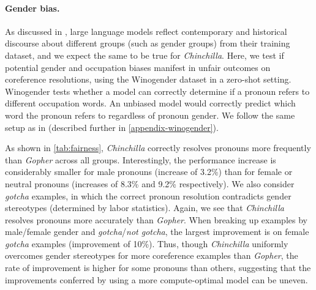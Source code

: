 \documentclass[11pt, a4paper, logo, copyright, nonumbering]{deepmind}
\newcommand{\gopher}{\textit{Gopher}\xspace}
\newcommand{\chinchilla}{\textit{Chinchilla}\xspace}
\begin{document}
\paragraph{Gender bias.}
As discussed in \citet{rae2021gopher}, large language models reflect contemporary and historical discourse about different groups (such as gender groups) from their training dataset, and we expect the same to be true for \chinchilla. 
Here, we test if potential gender and occupation biases manifest in unfair outcomes on coreference resolutions, using the Winogender dataset \citep{rudinger2018gender} in a zero-shot setting.
Winogender tests whether a model can correctly determine if a pronoun refers to different occupation words.
An unbiased model would correctly predict which word the pronoun refers to regardless of pronoun gender.
 We follow the same setup as in \citet{rae2021gopher} (described further in \autoref{appendix-winogender}).


As shown in \autoref{tab:fairness}, \chinchilla correctly resolves pronouns more frequently than \gopher across all groups.  
Interestingly, the performance increase is considerably smaller for male pronouns (increase of 3.2\%) than for female or neutral pronouns (increases of 8.3\% and 9.2\% respectively). We also consider \textit{gotcha} examples, in which the correct pronoun resolution contradicts gender stereotypes (determined by labor statistics).  Again, we see that \chinchilla resolves pronouns more accurately than \gopher.  When breaking up examples by male/female gender and \textit{gotcha}/\textit{not gotcha}, the largest improvement is on female \textit{gotcha} examples (improvement of 10\%).
Thus, though \chinchilla uniformly overcomes gender stereotypes for more coreference examples than \gopher, the rate of improvement is higher for some pronouns than others, suggesting that the improvements conferred by using a more compute-optimal model can be uneven.
\end{document}
